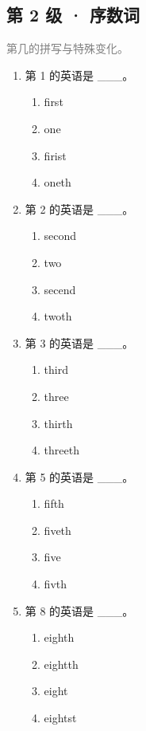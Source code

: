 \documentclass[11pt,a4paper]{ctexart}
\begin{document}
\subsection*{第 2 级 · 序数词}
\noindent\textcolor{gray}{第几的拼写与特殊变化。}\par\smallskip
\begin{enumerate}[leftmargin=*,itemsep=4pt]
\item 第 1 的英语是 \_\_\_。
\begin{enumerate}[label=\Alph*.,leftmargin=2em,itemsep=1pt,topsep=2pt]
\item first
\item one
\item firist
\item oneth
\end{enumerate}
\item 第 2 的英语是 \_\_\_。
\begin{enumerate}[label=\Alph*.,leftmargin=2em,itemsep=1pt,topsep=2pt]
\item second
\item two
\item secend
\item twoth
\end{enumerate}
\item 第 3 的英语是 \_\_\_。
\begin{enumerate}[label=\Alph*.,leftmargin=2em,itemsep=1pt,topsep=2pt]
\item third
\item three
\item thirth
\item threeth
\end{enumerate}
\item 第 5 的英语是 \_\_\_。
\begin{enumerate}[label=\Alph*.,leftmargin=2em,itemsep=1pt,topsep=2pt]
\item fifth
\item fiveth
\item five
\item fivth
\end{enumerate}
\item 第 8 的英语是 \_\_\_。
\begin{enumerate}[label=\Alph*.,leftmargin=2em,itemsep=1pt,topsep=2pt]
\item eighth
\item eightth
\item eight
\item eightst
\end{enumerate}

\end{enumerate}
\end{document}
